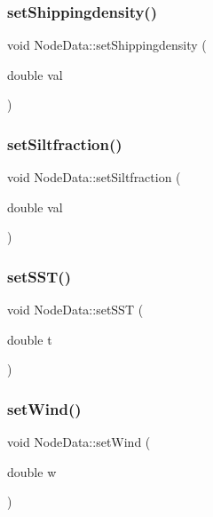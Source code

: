 \subsubsection{\texorpdfstring{setShippingdensity()}{setShippingdensity()}}
{\footnotesize\ttfamily void Node\+Data\+::set\+Shippingdensity (\begin{DoxyParamCaption}\item[{double}]{val }\end{DoxyParamCaption})\hspace{0.3cm}{\ttfamily [inline]}}

\mbox{\label{class_node_data_a1bc687cd7cfcfc9dcfb0b28ed0018cc5}} 
\subsubsection{\texorpdfstring{setSiltfraction()}{setSiltfraction()}}
{\footnotesize\ttfamily void Node\+Data\+::set\+Siltfraction (\begin{DoxyParamCaption}\item[{double}]{val }\end{DoxyParamCaption})\hspace{0.3cm}{\ttfamily [inline]}}

\mbox{\label{class_node_data_a2b9440fd8903a222c1f56e1b347db808}} 
\subsubsection{\texorpdfstring{setSST()}{setSST()}}
{\footnotesize\ttfamily void Node\+Data\+::set\+S\+ST (\begin{DoxyParamCaption}\item[{double}]{t }\end{DoxyParamCaption})\hspace{0.3cm}{\ttfamily [inline]}}

\mbox{\label{class_node_data_a4aa6a415cd96ce607564cdf91c9a83a4}} 
\subsubsection{\texorpdfstring{setWind()}{setWind()}}
{\footnotesize\ttfamily void Node\+Data\+::set\+Wind (\begin{DoxyParamCaption}\item[{double}]{w }\end{DoxyParamCaption})\hspace{0.3cm}{\ttfamily [inline]}}



